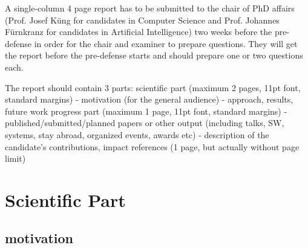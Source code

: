 \documentclass[a4paper,oneside,10pt,ngerman,english]{scrartcl}
\begin{document}
A single-column 4 page report has to be submitted to the chair of PhD affairs (Prof. Josef Küng for candidates in Computer Science and Prof. Johannes Fürnkranz for candidates in Artificial Intelligence) two weeks before the pre-defense in order for the chair and examiner to prepare questions. They will get the report before the pre-defense starts and should prepare one or two questions each.

The report should contain 3 parts:
scientific part (maximum 2 pages, 11pt font, standard margins)
- motivation (for the general audience)
- approach, results, future work
progress part (maximum 1 page, 11pt font, standard margins)
- published/submitted/planned papers or other output (including talks, SW, systems, stay abroad, organized events, awards etc)
- description of the candidate's contributions, impact
references (1 page, but actually without page limit)



\section{Scientific Part}
\label{sec:science}

\subsection{motivation}



\end{document}
